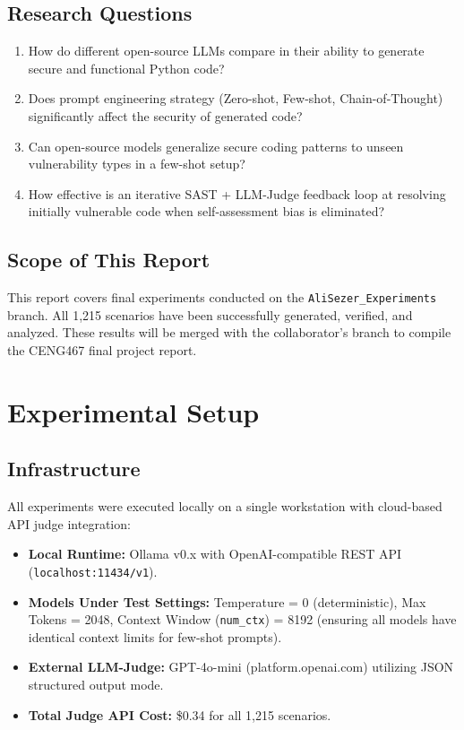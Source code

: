 \documentclass[12pt,a4paper]{article}
\begin{document}
\subsection{Research Questions}
\begin{enumerate}[label=\textbf{RQ\arabic*}:]
  \item How do different open-source LLMs compare in their ability to generate secure and functional Python code?
  \item Does prompt engineering strategy (Zero-shot, Few-shot, Chain-of-Thought) significantly affect the security of generated code?
  \item Can open-source models generalize secure coding patterns to unseen vulnerability types in a few-shot setup?
  \item How effective is an iterative SAST + LLM-Judge feedback loop at resolving initially vulnerable code when self-assessment bias is eliminated?
\end{enumerate}

\subsection{Scope of This Report}
This report covers final experiments conducted on the \texttt{AliSezer\_Experiments} branch. All 1,215 scenarios have been successfully generated, verified, and analyzed. These results will be merged with the collaborator's branch to compile the CENG467 final project report.

\section{Experimental Setup}
\label{sec:setup}

\subsection{Infrastructure}
All experiments were executed locally on a single workstation with cloud-based API judge integration:
\begin{itemize}
  \item \textbf{Local Runtime:} Ollama v0.x with OpenAI-compatible REST API (\texttt{localhost:11434/v1}).
  \item \textbf{Models Under Test Settings:} Temperature = 0 (deterministic), Max Tokens = 2048, Context Window (\texttt{num\_ctx}) = 8192 (ensuring all models have identical context limits for few-shot prompts).
  \item \textbf{External LLM-Judge:} GPT-4o-mini (platform.openai.com) utilizing JSON structured output mode.
  \item \textbf{Total Judge API Cost:} \$0.34 for all 1,215 scenarios.
\end{itemize}
\end{document}

